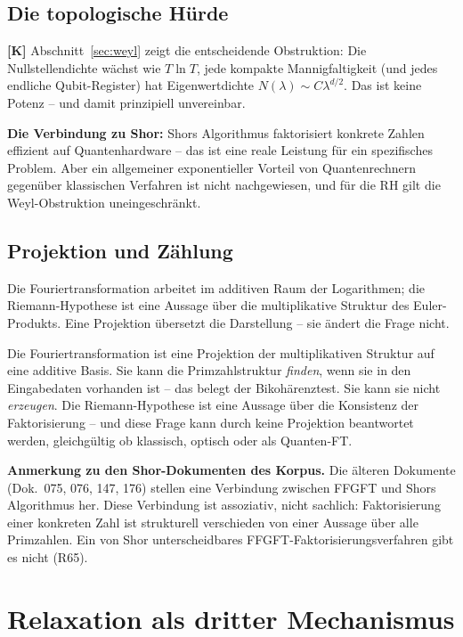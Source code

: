 \subsection{Die topologische H\"urde}

\textbf{[K]} Abschnitt~\ref{sec:weyl} zeigt die entscheidende Obstruktion: Die
Nullstellendichte w\"achst wie $T\ln T$, jede kompakte Mannigfaltigkeit (und
jedes endliche Qubit-Register) hat Eigenwertdichte
$N(\lambda) \sim C\lambda^{d/2}$. Das ist keine Potenz -- und damit prinzipiell
unvereinbar.

\textbf{Die Verbindung zu Shor:} Shors Algorithmus faktorisiert konkrete Zahlen
effizient auf Quantenhardware -- das ist eine reale Leistung f\"ur ein
spezifisches Problem. Aber ein allgemeiner exponentieller Vorteil von
Quantenrechnern gegen\"uber klassischen Verfahren ist nicht nachgewiesen, und
f\"ur die RH gilt die Weyl-Obstruktion uneingeschr\"ankt.

\subsection{Projektion und Z\"ahlung}

Die Fouriertransformation arbeitet im additiven Raum der Logarithmen; die
Riemann-Hypothese ist eine Aussage \"uber die multiplikative Struktur des
Euler-Produkts. Eine Projektion \"ubersetzt die Darstellung -- sie \"andert
die Frage nicht.

\begin{highlight}
Die Fouriertransformation ist eine Projektion der multiplikativen Struktur
auf eine additive Basis. Sie kann die Primzahlstruktur \emph{finden}, wenn
sie in den Eingabedaten vorhanden ist -- das belegt der Bikoh\"arenztest.
Sie kann sie nicht \emph{erzeugen}. Die Riemann-Hypothese ist eine Aussage
\"uber die Konsistenz der Faktorisierung -- und diese Frage kann durch keine
Projektion beantwortet werden, gleichg\"ultig ob klassisch, optisch oder als
Quanten-FT.
\end{highlight}

\textbf{Anmerkung zu den Shor-Dokumenten des Korpus.} Die \"alteren Dokumente
(Dok.~075, 076, 147, 176) stellen eine Verbindung zwischen FFGFT und Shors
Algorithmus her. Diese Verbindung ist assoziativ, nicht sachlich:
Faktorisierung einer konkreten Zahl ist strukturell verschieden von einer
Aussage \"uber alle Primzahlen. Ein von Shor unterscheidbares
FFGFT-Faktorisierungsverfahren gibt es nicht (R65).

\section{Relaxation als dritter Mechanismus}
\label{sec:relaxation}

